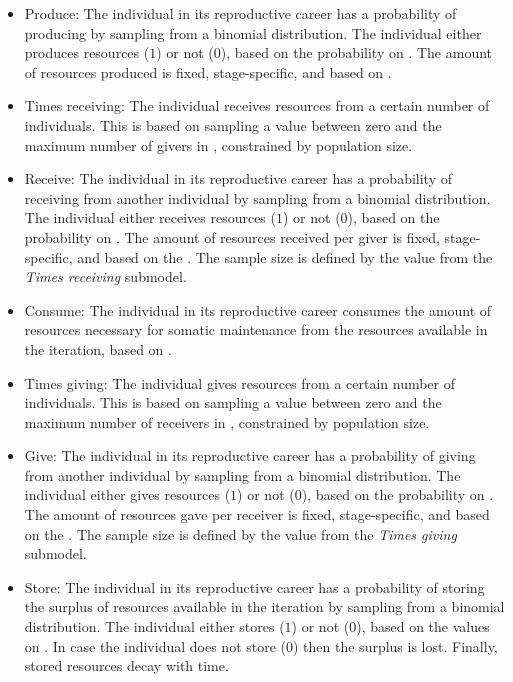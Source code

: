 \documentclass{article}
\begin{document}
\begin{itemize}
\begin{itemize}
        \item Produce: The individual in its reproductive career has a probability of producing by sampling from a binomial distribution. The individual either produces resources ($1$) or not ($0$), based on the probability on \cite{koster2020life}. The amount of resources produced is fixed, stage-specific, and based on \cite{koster2020life}.
        \item Times receiving: The individual receives resources from a certain number of individuals. This is based on sampling a value between zero and the maximum number of givers in \cite{gurven2004give}, constrained by population size.
        \item Receive: The individual in its reproductive career has a probability of receiving from another individual by sampling from a binomial distribution. The individual either receives resources ($1$) or not ($0$), based on the probability on \cite{gurven2004give}. The amount of resources received per giver is fixed, stage-specific, and based on the \cite{gurven2004give}. The sample size is defined by the value from the \emph{Times receiving} submodel. 
        \item Consume: The individual in its reproductive career consumes the amount of resources necessary for somatic maintenance from the resources available in the iteration, based on \cite{kaplan2000theory}.
        \item Times giving: The individual gives resources from a certain number of individuals. This is based on sampling a value between zero and the maximum number of receivers in \cite{gurven2004give}, constrained by population size.
        \item Give: The individual in its reproductive career has a probability of giving from another individual by sampling from a binomial distribution. The individual either gives resources ($1$) or not ($0$), based on the probability on \cite{gurven2004give}. The amount of resources gave per receiver is fixed, stage-specific, and based on the \cite{gurven2004give}. The sample size is defined by the value from the \emph{Times giving} submodel. 
        \item Store: The individual in its reproductive career has a probability of storing the surplus of resources available in the iteration by sampling from a binomial distribution. The individual either stores ($1$) or not ($0$), based on the values on \citep{bowles2011cultivation}. In case the individual does not store ($0$) then the surplus is lost. Finally, stored resources decay with time.

\end{itemize}
\end{itemize}
\end{document}

